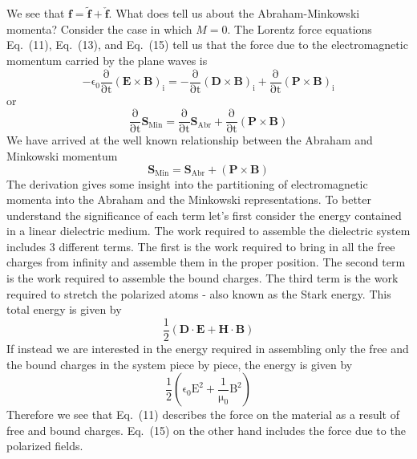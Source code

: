 \documentclass[twocolumn,english,pra,aps,superscriptaddress,floatfix]{revtex4-1}
\begin{document}
We see that $\mathbf{f}=\tilde{\mathbf{f}}+\check{\mathbf{f}}$.  What does tell us about the Abraham-Minkowski momenta?
Consider the case in which $M=0$. The Lorentz force equations Eq.\ (11), Eq.\ (13), and Eq.\ (15) tell us that the force due to the electromagnetic momentum carried by the plane waves is
\begin{equation}
\mathrm{-\epsilon_0\frac{\partial}{\partial t} \left(\mathbf{E}\times \mathbf{B}\right)_i=-\frac{\partial}{\partial t} \left(\mathbf{D}\times \mathbf{B}\right)_i+\frac{\partial}{\partial t} \left(\mathbf{P}\times \mathbf{B}\right)_i}
\end{equation}
or
\begin{equation}
\mathrm{\frac{\partial}{\partial t}\mathbf{S}_{Min}=\frac{\partial}{\partial t}\mathbf{S}_{Abr}+\frac{\partial}{\partial t}\left(\mathbf{P}\times \mathbf{B}\right)}
\end{equation}
We have arrived at the well known relationship between the Abraham and Minkowski momentum 
\begin{equation}
\mathrm{\mathbf{S}_{Min}=\mathbf{S}_{Abr}+\left(\mathbf{P}\times \mathbf{B}\right)}
\end{equation}
The derivation gives some insight into the partitioning of electromagnetic momenta into the Abraham and the Minkowski representations.  To better understand the significance of each term let's first consider the energy contained in a linear dielectric medium.  The work required to assemble the dielectric system includes 3 different terms.  The first is the work required to bring in all the free charges from infinity and assemble them in the proper position.  The second term is the work required to assemble the bound charges.  The third term is the work required to stretch the polarized atoms - also known as the Stark energy.  This total energy is given by
\begin{equation}
\mathrm{\frac{1}{2}\left(\mathbf{D}\cdot\mathbf{E}+\mathbf{H}\cdot\mathbf{B}\right)}
\end{equation}
If instead we are interested in the energy required in assembling only the free and the bound charges in the system piece by piece, the energy is given by 
\begin{equation}
\mathrm{\frac{1}{2}\left(\epsilon_0 E^2+\frac{1}{\mu_0}B^2\right)}
\end{equation}
Therefore we see that  Eq.\ (11) describes the force on the material as a result of free and bound charges.   Eq.\ (15) on the other hand includes the force due to the polarized fields.
\end{document}
